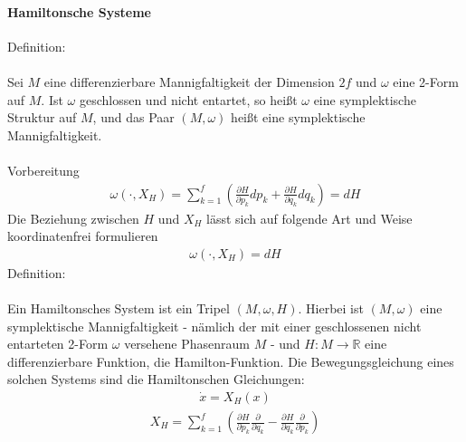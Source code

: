 \documentclass[10pt,a4paper]{article}
\begin{document}
\paragraph{Hamiltonsche Systeme} $\,$\\
Definition: \\
\\
Sei $M$ eine differenzierbare Mannigfaltigkeit der Dimension $2f$ und $ \omega $ eine 2-Form auf $M$. Ist $\omega$ geschlossen und nicht entartet, so heißt $\omega$ eine symplektische Struktur auf $M$, und das Paar $(M,\omega)$ heißt eine symplektische Mannigfaltigkeit.\\
\\
Vorbereitung
\begin{align}
\omega(\cdot,X_H)=\sum_{k=1}^f(\frac{\partial H}{\partial p_k}dp_k + \frac{\partial H}{\partial q_k} dq_k)=dH
\end{align}
Die Beziehung zwischen $H$ und $X_H$ lässt sich auf folgende Art und Weise koordinatenfrei formulieren
\begin{align}
\omega (\cdot, X_H)=dH
\end{align}
Definition:\\
\\
Ein Hamiltonsches System ist ein Tripel $(M,\omega,H)$. Hierbei ist $ (M,\omega)$ eine symplektische Mannigfaltigkeit - nämlich der mit einer geschlossenen nicht entarteten 2-Form $\omega$ versehene Phasenraum $M$ - und $H: M \longrightarrow \mathbb{R} $ eine differenzierbare Funktion, die Hamilton-Funktion. Die Bewegungsgleichung eines solchen Systems sind die Hamiltonschen Gleichungen:
\begin{align}
\dot{x}= X_H(x)
\end{align}
\begin{align}
X_H=\sum_{k=1}^f(\frac{\partial H}{\partial p_k} \frac{\partial}{\partial q_k}- \frac{\partial H}{\partial q_k} \frac{\partial}{\partial p_k})
\end{align}
\end{document}
